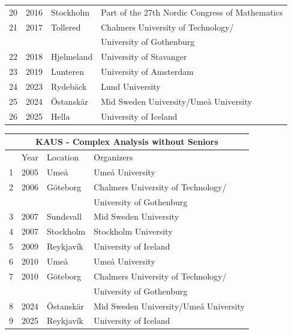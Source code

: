 \documentclass[12pt, openany, twoside]{report}      %
\begin{document}
\begin{center}
\begin{tabular}{llll}
        20 & 2016 & Stockholm & Part of the 27th Nordic Congress of Mathematics\\
        21 & 2017 & Tollered & Chalmers University of Technology/\\
           &      &               & University of Gothenburg\\
        22 & 2018 & Hjelmeland & University of Stavanger\\
        23 & 2019 & Lunteren & University of Amsterdam\\
        24 & 2023 & Rydebäck & Lund University\\
        25 & 2024 & Östanskär & Mid Sweden University/Umeå University\\
        26 & 2025 & Hella & University of Iceland\\
        \bottomrule
    \end{tabular}
\end{center}
    
\begin{center}
    \begin{tabular}{llll}
        \toprule
        \multicolumn{4}{c}{KAUS - Complex Analysis without Seniors}\\
        \midrule
         & Year & Location & Organizers \\
         \midrule
        1 & 2005 & Umeå & Umeå University\\
        2 & 2006 & Göteborg  & Chalmers University of Technology/\\
          &      &               & University of Gothenburg \\
        3 & 2007 & Sundsvall & Mid Sweden University\\
        4 & 2007 & Stockholm & Stockholm University  \\
        5 & 2009 & Reykjavík & University of Iceland\\
        6 & 2010 & Umeå & Umeå University\\
        7 & 2010 & Göteborg & Chalmers University of Technology/\\
           &      &               & University of Gothenburg\\
        8 & 2024 & Östanskär & Mid Sweden University/Umeå University\\
        9 & 2025 & Reykjavík & University of Iceland\\
        \bottomrule
    \end{tabular}
\end{center}
\end{document}

